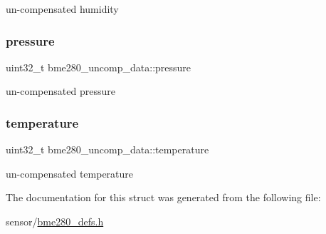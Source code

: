 un-\/compensated humidity \mbox{\label{structbme280__uncomp__data_afa4d1b43f8412d393dcc5fd41f4203ce}} 
\subsubsection{\texorpdfstring{pressure}{pressure}}
{\footnotesize\ttfamily uint32\+\_\+t bme280\+\_\+uncomp\+\_\+data\+::pressure}

un-\/compensated pressure \mbox{\label{structbme280__uncomp__data_a0ae24e11ffef8390b948b53ba4dbb652}} 
\subsubsection{\texorpdfstring{temperature}{temperature}}
{\footnotesize\ttfamily uint32\+\_\+t bme280\+\_\+uncomp\+\_\+data\+::temperature}

un-\/compensated temperature 

The documentation for this struct was generated from the following file\+:\begin{DoxyCompactItemize}
\item 
sensor/\hyperlink{bme280__defs_8h}{bme280\+\_\+defs.\+h}\end{DoxyCompactItemize}
